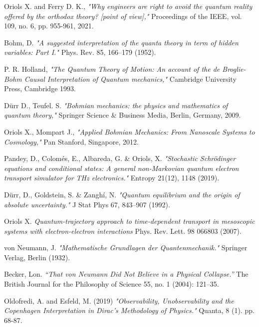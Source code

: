 \documentclass[11pt, a4paper]{article} %
\begin{document}
\newpage
\begin{thebibliography}{1}
{\footnotesize 

Oriols X. and Ferry D. K., {\em "Why engineers are right to avoid the quantum reality offered by the orthodox theory? [point of view],"} Proceedings of the IEEE, vol. 109, no. 6, pp. 955-961, 2021.

Bohm, D. {\em "A suggested interpretation of the quanta theory in term of hidden variables: Part I."} Phys. Rev. 85, 166–179 (1952).

P. R. Holland, {\em "The Quantum Theory of Motion: An account of the de Broglie-Bohm Causal Interpretation of Quantum
mechanics,"} Cambridge University Press, Cambridge 1993.

Dürr D., Teufel. S. {\em "Bohmian mechanics: the physics and mathematics of quantum theory,"} Springer Science \& Business Media, Berlin, Germany, 2009.

	Oriols X., Mompart J., {\em "Applied Bohmian Mechanics: From Nanoscale Systems to Cosmology,"} Pan Stanford, Singapore, 2012.
	
Pandey, D., Colomés, E., Albareda, G. \& Oriols, X. {\em "Stochastic Schrödinger equations and conditional states: A general non-Markovian quantum electron transport simulator for THz electronics."} Entropy 21(12), 1148 (2019).

Dürr, D., Goldstein, S. \& Zanghí, N. {\em "Quantum equilibrium and the origin of absolute uncertainty."} J Stat Phys 67, 843–907 (1992).

Oriols X. {\em Quantum-trajectory approach to time-dependent transport in mesoscopic systems with electron-electron interactions} Phys. Rev. Lett. 98 066803 (2007).


von Neumann, J. {\em "Mathematische Grundlagen der Quantenmechanik."} Springer Verlag, Berlin (1932).

Becker, Lon. {\em “That von Neumann Did Not Believe in a Physical Collapse.”} The British Journal for the Philosophy of Science 55, no. 1 (2004): 121–35.

Oldofredi, A. and Esfeld, M. (2019) {\em "Observability, Unobservability and the Copenhagen Interpretation in Dirac's Methodology of Physics."} Quanta, 8 (1). pp. 68-87.

}
\end{thebibliography}
\end{document}
